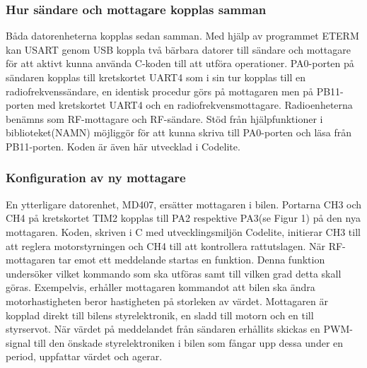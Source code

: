 \documentclass[a4paper]{article}
\begin{document}
\subsubsection{Hur sändare och mottagare kopplas samman}
\vspace{5mm} \noindent
Båda datorenheterna kopplas sedan samman. Med hjälp av programmet ETERM kan USART genom USB koppla två bärbara datorer till sändare och mottagare för att aktivt kunna använda C-koden till att utföra operationer. PA0-porten på sändaren kopplas till kretskortet UART4 som i sin tur kopplas till en radiofrekvenssändare, en identisk procedur görs på mottagaren men på PB11-porten med kretskortet UART4 och en radiofrekvensmottagare. Radioenheterna benämns som RF-mottagare och RF-sändare. Stöd från hjälpfunktioner i biblioteket(NAMN) möjliggör för att kunna skriva till PA0-porten och läsa från PB11-porten. Koden är även här utvecklad i Codelite.



\subsubsection{Konfiguration av ny mottagare}
\vspace{5mm} \noindent
En ytterligare datorenhet, MD407, ersätter mottagaren i bilen. Portarna CH3 och CH4 på kretskortet TIM2 kopplas till PA2 respektive PA3(se Figur 1) på den nya mottagaren. Koden, skriven i C med utvecklingsmiljön Codelite, initierar CH3 till att reglera motorstyrningen och CH4 till att kontrollera rattutslagen. När RF-mottagaren tar emot ett meddelande startas en funktion. Denna funktion undersöker vilket kommando som ska utföras samt till vilken grad detta skall göras. Exempelvis, erhåller mottagaren kommandot att bilen ska ändra motorhastigheten beror hastigheten på storleken av värdet. Mottagaren är kopplad direkt till bilens styrelektronik, en sladd till motorn och en till styrservot. När värdet på meddelandet från sändaren erhållits skickas en PWM-signal till den önskade styrelektroniken i bilen som fångar upp dessa under en period, uppfattar värdet och agerar.



\end{document}
